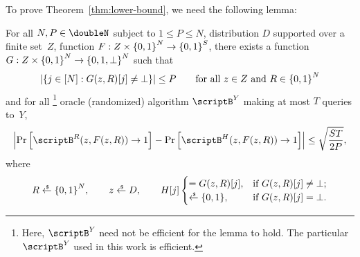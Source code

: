 To prove Theorem~\ref{thm:lower-bound}, we need the following lemma:

\begin{lemma}\label{lem:ai-rom}
For all ${N,P\in\doubleN}$ subject to ${1\leq P\leq N}$,
distribution $D$ supported over a finite set~$Z$,
function ${F:Z\times{\{0,1\}}^N\to{\{0,1\}}^S}$,
there exists a function ${G:Z\times\bit^N\to{\{0,1,\bot\}}^N}$ such that
\begin{align*}
|\{{j\in[N]}:{G(z,R)[j]\neq\bot}\}|\leq P
\qquad\textup{for all }z\in Z\textup{ and }R\in\bit^N
\end{align*}
and for all%
\footnote{Here, $\scriptB^Y$ need not be efficient for the lemma to hold.
The particular $\scriptB^Y$ used in this work is efficient.}
oracle (randomized) algorithm $\scriptB^Y$ making at most $T$ queries to~$Y$,
\begin{align*}
\left|
\Pr\left[\scriptB^R(z,F(z,R))\to 1\right]
-
\Pr\left[\scriptB^H(z,F(z,R))\to 1\right]
\right|
\leq
\sqrt{\frac{ST}{2P}},
\end{align*}
where
\begin{align*}
R\draws\bit^N,\qquad
z\draws D,\qquad
H[j]\begin{cases}
=G(z,R)[j],&\textup{if }G(z,R)[j]\neq\bot;\\
\draws\bit,&\textup{if }G(z,R)[j]=\bot.
\end{cases}
\end{align*}
\end{lemma}

